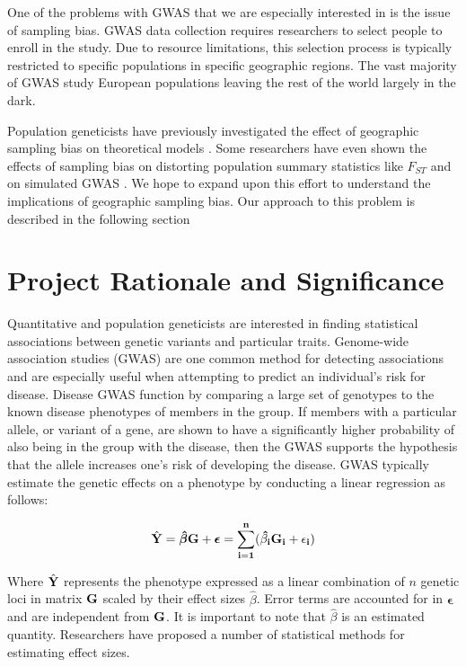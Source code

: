 One of the problems with GWAS that we are especially interested in is the issue of sampling bias. GWAS data collection requires researchers to select people to enroll in the study. Due to resource limitations, this selection process is typically restricted to specific populations in specific geographic regions. The vast majority of GWAS study European populations \cite{need_2009} \cite{popejoy_2016} leaving the rest of the world largely in the dark. 


Population geneticists have previously investigated the effect of geographic sampling bias on theoretical models \cite{mcvean_2009}. Some researchers have even shown the effects of sampling bias on distorting population summary statistics like $F_{ST}$ and on simulated GWAS \cite{battey_space_2019}. We hope to expand upon this effort to understand the implications of geographic sampling bias. Our approach to this problem is described in the following section


\section{Project Rationale and Significance}
Quantitative and population geneticists are interested in finding statistical associations between genetic variants and particular traits. Genome-wide association studies (GWAS) are one common method for detecting associations and are especially useful when attempting to predict an individual’s risk for disease. Disease GWAS function by comparing a large set of genotypes to the known disease phenotypes of members in the group. If members with a particular allele, or variant of a gene, are shown to have a significantly higher probability of also being in the group with the disease, then the GWAS supports the hypothesis that the allele increases one’s risk of developing the disease. GWAS typically estimate the genetic effects on a phenotype by conducting a linear regression as follows:\cite{dudbridge_2013} \cite{xie_xu_1998}

\begin{equation}
    \hat{\bf{Y}} = \boldsymbol{\hat{\beta}} \bf{G} + \boldsymbol{\epsilon} = \sum_{i=1}^{n} (\hat{\beta_i} G_i + \epsilon_i) 
\end{equation}

Where $\hat{\bf{Y}}$ represents the phenotype expressed as a linear combination of $n$ genetic loci in matrix $\bf{G}$ scaled by their effect sizes $\hat{\beta}$. Error terms are accounted for in $\boldsymbol{\epsilon}$ and are independent from $\bf{G}$. It is important to note that $\hat{\beta}$ is an estimated quantity. Researchers have proposed a number of statistical methods for estimating effect sizes. \cite{meuwissen_etal._2001} \cite{park_etal._2011}



